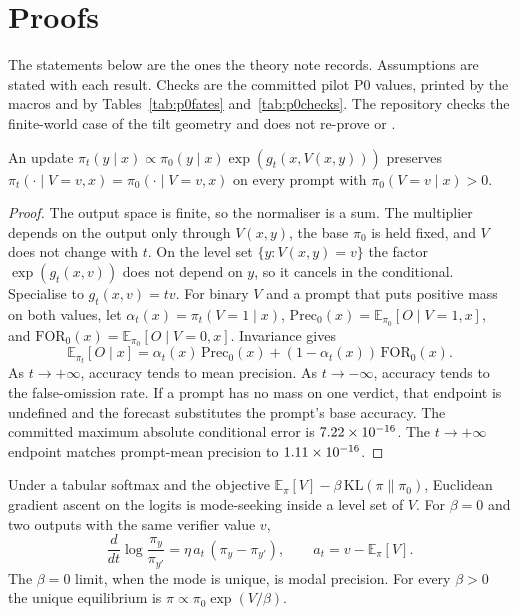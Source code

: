 \section{Proofs}
\label{app:proofs}

The statements below are the ones the theory note records.
Assumptions are stated with each result.
Checks are the committed pilot P0 values, printed by the macros and by Tables~\ref{tab:p0fates} and~\ref{tab:p0checks}.
The repository checks the finite-world case of the tilt geometry and does not re-prove \citet{mroueh2025tilt} or \citet{dorner2025tilt}.

\begin{lemma}
\label{lem:tilt}
An update $\pi_t(y \mid x) \propto \pi_0(y \mid x) \exp(g_t(x, V(x,y)))$ preserves $\pi_t(\cdot \mid V = v, x) = \pi_0(\cdot \mid V = v, x)$ on every prompt with $\pi_0(V = v \mid x) > 0$.
\end{lemma}

\begin{proof}
The output space is finite, so the normaliser is a sum.
The multiplier depends on the output only through $V(x,y)$, the base $\pi_0$ is held fixed, and $V$ does not change with $t$.
On the level set $\{y : V(x,y) = v\}$ the factor $\exp(g_t(x,v))$ does not depend on $y$, so it cancels in the conditional.
Specialise to $g_t(x,v) = t v$.
For binary $V$ and a prompt that puts positive mass on both values, let $\alpha_t(x) = \pi_t(V = 1 \mid x)$, $\mathrm{Prec}_0(x) = \mathbb{E}_{\pi_0}[O \mid V = 1, x]$, and $\mathrm{FOR}_0(x) = \mathbb{E}_{\pi_0}[O \mid V = 0, x]$.
Invariance gives
\[
\mathbb{E}_{\pi_t}[O \mid x] = \alpha_t(x)\,\mathrm{Prec}_0(x) + (1 - \alpha_t(x))\,\mathrm{FOR}_0(x).
\]
As $t \to +\infty$, accuracy tends to mean precision.
As $t \to -\infty$, accuracy tends to the false-omission rate.
If a prompt has no mass on one verdict, that endpoint is undefined and the forecast substitutes the prompt's base accuracy.
The committed maximum absolute conditional error is $7.22 \times 10^{-16}{}$.
The $t \to +\infty$ endpoint matches prompt-mean precision to $1.11 \times 10^{-16}{}$.
\end{proof}

\begin{proposition}
\label{prop:mode}
Under a tabular softmax and the objective $\mathbb{E}_\pi[V] - \beta\,\mathrm{KL}(\pi \| \pi_0)$, Euclidean gradient ascent on the logits is mode-seeking inside a level set of $V$.
For $\beta = 0$ and two outputs with the same verifier value $v$,
\[
\frac{d}{dt} \log \frac{\pi_y}{\pi_{y'}} = \eta \, a_t \, (\pi_y - \pi_{y'}), \qquad a_t = v - \mathbb{E}_\pi[V].
\]
The $\beta = 0$ limit, when the mode is unique, is modal precision.
For every $\beta > 0$ the unique equilibrium is $\pi \propto \pi_0 \exp(V / \beta)$.
\end{proposition}

